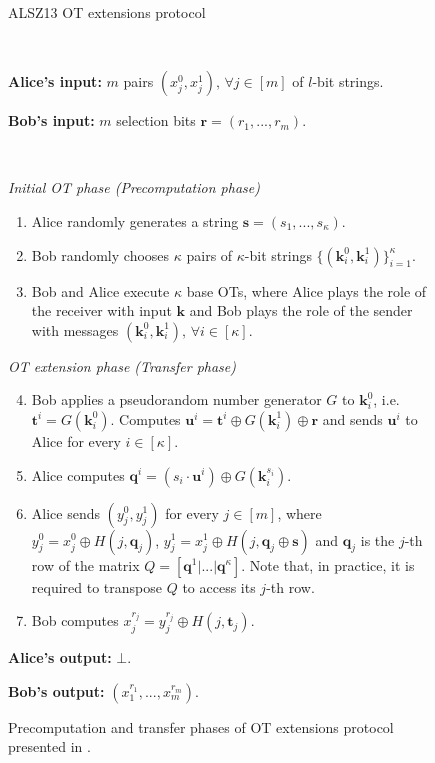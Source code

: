 \begin{figure}[t]
    \centering
        \begin{tcolorbox}
                        
			\centerline{ALSZ13 OT extensions protocol \citep{ALSZ13}}
            
			\ 

			\textbf{Alice's input:} $m$ pairs $(x^0_j, x^1_j),\, \forall j\in[m]$ of $l$-bit strings.
            
			\textbf{Bob's input:} $m$ selection bits $\bm{r} = (r_1, ..., r_m)$.

			\
			
			\textit{Initial OT phase (Precomputation phase)}
    \begin{enumerate}
         \item Alice randomly generates a string $\bm{s} = (s_1, ..., s_\kappa)$.
         \item Bob randomly chooses $\kappa$ pairs of $\kappa$-bit strings $\{(\bm{k}^0_i, \bm{k}^1_i)\}^\kappa_{i=1}$.
         \item Bob and Alice execute $\kappa$ base OTs, where Alice plays the role of the receiver with input $\bm{k}$ and Bob plays the role of the sender with messages $(\bm{k}^0_i, \bm{k}^1_i),\, \forall i\in[\kappa]$.
    \end{enumerate}
    \textit{OT extension phase (Transfer phase)}
    \begin{enumerate}
    \setcounter{enumi}{3}
        \item Bob applies a pseudorandom number generator $G$ to $\bm{k}^0_i$, i.e. $\bm{t}^i = G(\bm{k}^0_i)$. Computes $\bm{u}^i = \bm{t}^i \oplus G(\bm{k}^1_i) \oplus \bm{r}$ and sends $\bm{u}^i$ to Alice for every $ i\in[\kappa]$.
        \item Alice computes $\bm{q}^i = (s_i \cdot \bm{u}^i) \oplus G(\bm{k}^{s_i}_i)$.
        \item Alice sends $(y^0_j, y^1_j)$ for every $j\in[m]$, where $y^0_j = x^0_j\oplus H(j,\bm{q}_j)$, $y^1_j = x^1_j\oplus H(j,\bm{q}_j\oplus \bm{s})$ and $\bm{q}_j$ is the $j$-th row of the matrix $Q = [ \bm{q}^1 | ...| \bm{q}^\kappa]$. Note that, in practice, it is required to transpose $Q$ to access its $j$-th row.
        \item Bob computes $x^{r_j}_j = y^{r_j}_j \oplus H(j, \bm{t}_j)$.
    \end{enumerate} 
    
				\textbf{Alice's output:} $\bot$.
    
				\textbf{Bob's output:} $(x^{r_1}_1, ..., x^{r_m}_m)$.

        
        \end{tcolorbox}
    \caption{Precomputation and transfer phases of OT extensions protocol presented in \cite{ALSZ13}.}
    \label{fig:ALSZ13Protocol}
\end{figure}


